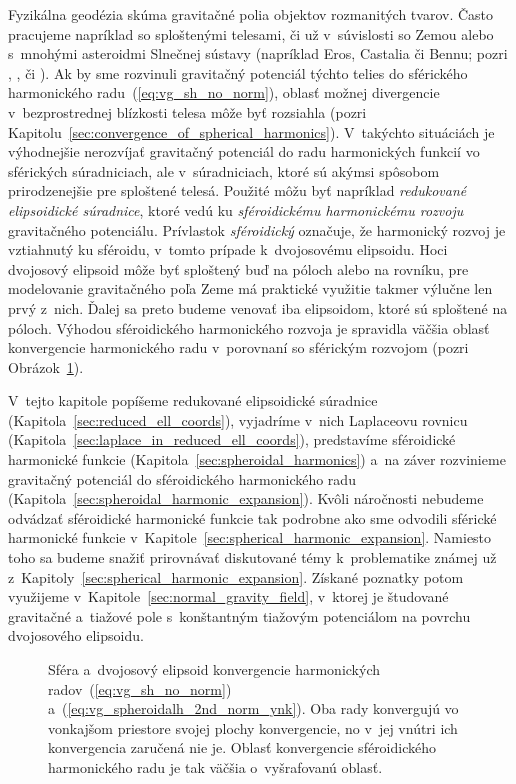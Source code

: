 \documentclass[a4paper, 12pt]{book}
\begin{document}
Fyzikálna geodézia skúma gravitačné polia objektov rozmanitých tvarov.  Často 
pracujeme napríklad so sploštenými telesami, či už v~súvislosti so Zemou alebo 
s~mnohými asteroidmi Slnečnej sústavy (napríklad Eros, Castalia či Bennu; pozri 
\cite{Garmier2001}, \cite{Hu2015}, \cite{Sebera2016} či \cite{Reimond2016}).  
Ak by sme rozvinuli gravitačný potenciál týchto telies do sférického 
harmonického radu~(\ref{eq:vg_sh_no_norm}), oblasť možnej divergencie 
v~bezprostrednej blízkosti telesa môže byť rozsiahla (pozri 
Kapitolu~\ref{sec:convergence_of_spherical_harmonics}).  V~takýchto situáciách 
je výhodnejšie nerozvíjať gravitačný potenciál do radu harmonických funkcií vo 
sférických súradniciach, ale v~súradniciach, ktoré sú akýmsi spôsobom 
prirodzenejšie pre sploštené telesá.  Použité môžu byť napríklad 
\emph{redukované elipsoidické súradnice}, ktoré vedú ku \emph{sféroidickému 
harmonickému rozvoju} gravitačného potenciálu.  Prívlastok \emph{sféroidický} 
označuje, že harmonický rozvoj je vztiahnutý ku sféroidu, v~tomto prípade 
k~dvojosovému elipsoidu.  Hoci dvojosový elipsoid môže byť sploštený buď na 
póloch alebo na rovníku, pre modelovanie gravitačného poľa Zeme má praktické 
využitie takmer výlučne len prvý z~nich.  Ďalej sa preto budeme venovať iba 
elipsoidom, ktoré sú sploštené na póloch.  Výhodou sféroidického harmonického 
rozvoja je spravidla väčšia oblasť konvergencie harmonického radu v~porovnaní 
so sférickým rozvojom (pozri 
Obrázok~\ref{fig:spheroidal_harmonics_convergence}).

V~tejto kapitole popíšeme redukované elipsoidické súradnice 
(Kapitola~\ref{sec:reduced_ell_coords}), vyjadríme v~nich Laplaceovu rovnicu 
(Kapitola~\ref{sec:laplace_in_reduced_ell_coords}), predstavíme sféroidické 
harmonické funkcie (Kapitola~\ref{sec:spheroidal_harmonics}) a~na záver 
rozvinieme gravitačný potenciál do sféroidického harmonického radu 
(Kapitola~\ref{sec:spheroidal_harmonic_expansion}).  Kvôli náročnosti nebudeme 
odvádzať sféroidické harmonické funkcie tak podrobne ako sme odvodili sférické 
harmonické funkcie v~Kapitole~\ref{sec:spherical_harmonic_expansion}.  Namiesto 
toho sa budeme snažiť prirovnávať diskutované témy k~problematike známej už 
z~Kapitoly~\ref{sec:spherical_harmonic_expansion}.  Získané poznatky potom 
využijeme v~Kapitole~\ref{sec:normal_gravity_field}, v~ktorej je študované 
gravitačné a~tiažové pole s~konštantným tiažovým potenciálom na povrchu 
dvojosového elipsoidu.

\begin{figure}
\centering

\caption{Sféra a~dvojosový elipsoid konvergencie harmonických 
radov~(\ref{eq:vg_sh_no_norm}) a~(\ref{eq:vg_spheroidalh_2nd_norm_ynk}).  Oba 
rady konvergujú vo vonkajšom priestore svojej plochy konvergencie, no v~jej 
vnútri ich konvergencia zaručená nie je.  Oblasť konvergencie sféroidického 
harmonického radu je tak väčšia o~vyšrafovanú oblasť.}
\label{fig:spheroidal_harmonics_convergence}
\end{figure}
\end{document}
